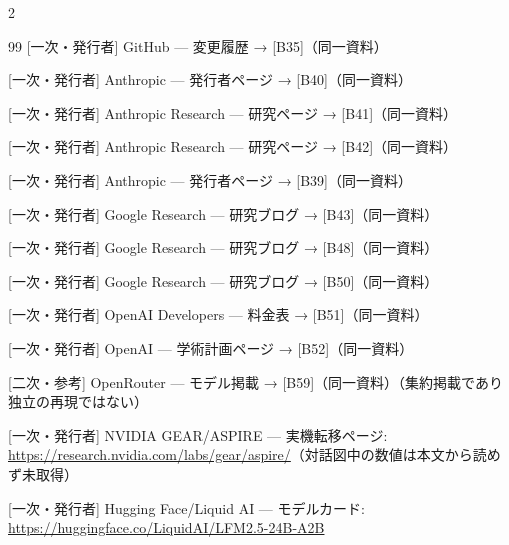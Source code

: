 \documentclass[lualatex,a4paper,10pt]{jlreq}
\begin{document}
\begin{multicols}{2}
\begin{thebibliography}{99}
 [一次・発行者] GitHub — 変更履歴 → [B35]（同一資料）

 [一次・発行者] Anthropic — 発行者ページ → [B40]（同一資料）

 [一次・発行者] Anthropic Research — 研究ページ → [B41]（同一資料）

 [一次・発行者] Anthropic Research — 研究ページ → [B42]（同一資料）

 [一次・発行者] Anthropic — 発行者ページ → [B39]（同一資料）

 [一次・発行者] Google Research — 研究ブログ → [B43]（同一資料）

 [一次・発行者] Google Research — 研究ブログ → [B48]（同一資料）

 [一次・発行者] Google Research — 研究ブログ → [B50]（同一資料）

 [一次・発行者] OpenAI Developers — 料金表 → [B51]（同一資料）

 [一次・発行者] OpenAI — 学術計画ページ → [B52]（同一資料）

 [二次・参考] OpenRouter — モデル掲載 → [B59]（同一資料）（集約掲載であり独立の再現ではない）

 [一次・発行者] NVIDIA GEAR/ASPIRE — 実機転移ページ: \url{https://research.nvidia.com/labs/gear/aspire/}（対話図中の数値は本文から読めず未取得）

 [一次・発行者] Hugging Face/Liquid AI — モデルカード: \url{https://huggingface.co/LiquidAI/LFM2.5-24B-A2B}

\end{thebibliography}
\end{multicols} %
\end{document}
